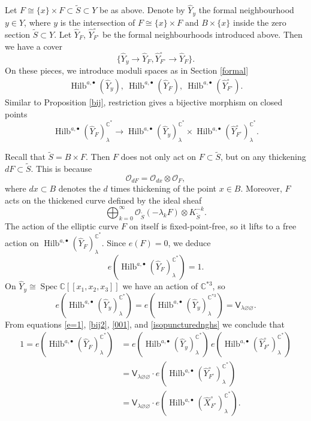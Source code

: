 \documentclass{amsart}
\theoremstyle{definition}
\newcommand{\CC} {\mathbb{C}}          %
\renewcommand{\O}{\mathcal{O}}
\newcommand{\sfV}{\mathsf{V}}
\newcommand{\Hilb}{\operatorname{Hilb}}
\newcommand{\Spec}{\operatorname{Spec}}
\newcommand{\Xhat}{\widehat{X}}
\begin{document}
Let $F \cong \{x\} \times F \subset \tilde{S} \subset Y$ be as above. Denote by $\widehat{Y}_{y}$ the formal neighbourhood $y \in Y$, where $y$ is the intersection of $F \cong \{x\} \times F$ and $B \times \{x\}$ inside the zero section $\tilde{S} \subset Y$. Let $\widehat{Y}_F$, $\widehat{Y}^{\circ}_{F^\circ}$ be the formal neighbourhoods introduced above. Then we have a cover
$$
\{\widehat{Y}_y \rightarrow \widehat{Y}_F, \widehat{Y}^{\circ}_{F^\circ} \rightarrow \widehat{Y}_F\}. 
$$
On these pieces, we introduce moduli spaces as in Section \ref{formal}
\begin{align*}
\Hilb^{a,\bullet}(\widehat{Y}_y), \ \Hilb^{a,\bullet}(\widehat{Y}_F), \ \Hilb^{a,\bullet}(\widehat{Y}^{\circ}_{F^\circ}).
\end{align*}
Similar to Proposition \ref{bij}, restriction gives a bijective morphism on closed points
\begin{equation} \label{bij2}
\Hilb^{a,\bullet}(\widehat{Y}_F)^{\CC^*}_{\lambda} \rightarrow \Hilb^{a,\bullet}(\widehat{Y}_y)^{\CC^*}_{\lambda} \times \Hilb^{a,\bullet}(\widehat{Y}^{\circ}_{F^\circ})^{\CC^*}_{\lambda}.
\end{equation}

Recall that $\tilde{S} = B \times F$. Then $F$ does not only act on $F \subset \tilde{S}$, but on any thickening $d F \subset \tilde{S}$. This is because
$$
\O_{dF} = \O_{d x} \otimes \O_F,
$$
where $dx \subset B$ denotes the $d$ times thickening of the point $x \in B$. Moreover, $F$ acts on the thickened curve defined by the ideal sheaf
$$
\bigoplus_{k=0}^{\infty} \O_{\tilde{S}}(-\lambda_k F) \otimes K_{\tilde{S}}^{-k}.
$$
The action of the elliptic curve $F$ on itself is fixed-point-free, so it lifts to a free action on $\Hilb^{a,\bullet}(\widehat{Y}_F)^{\CC^*}_{\lambda}$. Since $e(F) = 0$, we deduce
\begin{equation} \label{e=1}
e(\Hilb^{a,\bullet}(\widehat{Y}_F)^{\CC^*}_{\lambda}) = 1.
\end{equation}
On $\widehat{Y}_y \cong \Spec \CC[\![x_1,x_2,x_3]\!]$ we have an action of $\CC^{*3}$, so
\begin{equation} \label{001}
e(\Hilb^{a,\bullet}(\widehat{Y}_y)^{\CC^*}_{\lambda}) = e(\Hilb^{a,\bullet}(\widehat{Y}_y)^{\CC^{*3}}_{\lambda}) = \sfV_{\lambda\varnothing\varnothing}.
\end{equation}
From equations \eqref{e=1}, \eqref{bij2}, \eqref{001}, and \eqref{isopuncturednghs} we conclude that
\begin{align*}
1=e(\Hilb^{a,\bullet}(\widehat{Y}_F)^{\CC^*}_{\lambda}) &= e( \Hilb^{a,\bullet}(\widehat{Y}_y)^{\CC^*}_{\lambda}) \, e(\Hilb^{a,\bullet}(\widehat{Y}^{\circ}_{F^\circ})^{\CC^*}_{\lambda}) \\
&=  \sfV_{\lambda\varnothing\varnothing} \cdot e(\Hilb^{a,\bullet}(\widehat{Y}^{\circ}_{F^\circ})^{\CC^*}_{\lambda}) \\
&=  \sfV_{\lambda\varnothing\varnothing} \cdot e(\Hilb^{a,\bullet}(\Xhat ^{\circ}_{F^\circ})^{\CC^*}_{\lambda}).
\end{align*}
\end{document}

